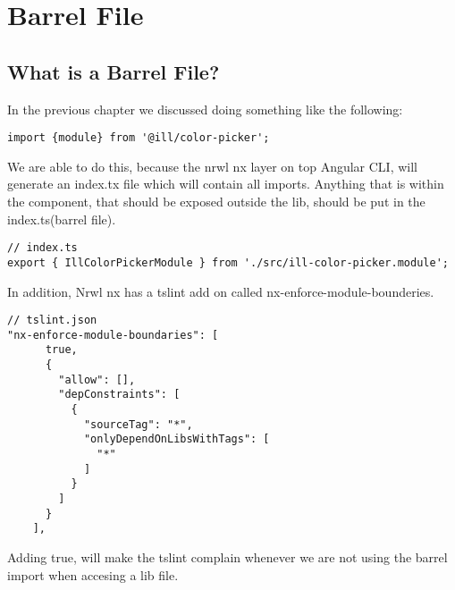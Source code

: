 \maketitle{}
\section{ Barrel File }

\subsection{ What is a Barrel File? }

In the previous chapter we discussed doing something like the following:
\begin{lstlisting}
import {module} from '@ill/color-picker';
\end{lstlisting}

We are able to do this, because the nrwl nx layer on top Angular CLI, will
generate an index.tx file which will contain all imports. Anything that is
within the component, that should be exposed outside the lib, should be put
in the index.ts(barrel file).

\begin{lstlisting}
// index.ts
export { IllColorPickerModule } from './src/ill-color-picker.module';
\end{lstlisting}

In addition, Nrwl nx has a tslint add on called nx-enforce-module-bounderies.
\begin{lstlisting}
// tslint.json
"nx-enforce-module-boundaries": [
      true,
      {
        "allow": [],
        "depConstraints": [
          {
            "sourceTag": "*",
            "onlyDependOnLibsWithTags": [
              "*"
            ]
          }
        ]
      }
    ],
\end{lstlisting}

Adding true, will make the tslint complain whenever we are not using the barrel
import when accesing a lib file.
